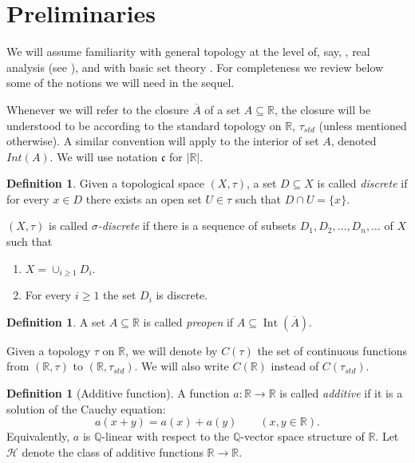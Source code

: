 \documentclass[11pt]{amsart} %
\theoremstyle{definition}
\newtheorem{definition}[theorem]{Definition}
\newcommand{\R}{\mathbb{R}}
\newcommand{\Q}{\mathbb{Q}}
\newcommand{\AD}{\mathcal{H}}
\begin{document}
\section{Preliminaries} 

We will assume familiarity with general topology at the level of, say, \cite{26}, real analysis (see \cite{5}), and with basic set theory \cite{7}. For completeness we review below some of the notions we will need in the sequel. 

Whenever we will refer to the closure $\overline{A}$ of a set $A\subseteq \R$, the closure will be understood to be according to the standard topology on $
\R$, $\tau_{std}$ (unless mentioned otherwise). A similar convention will apply to the interior of set $A$, denoted $Int(A)$. We will use notation $\mathfrak{c}$ for $|\R|$. 

\begin{definition} Given a topological space $(X,\tau)$, 
a set $D\subseteq X$ is called \emph{discrete} if for every $x\in D$ there exists an open set $U\in \tau$ such that 
$D\cap U = \{x\}$. 

$(X,\tau)$ is called \emph{$\sigma$-discrete} if there is a sequence of subsets $D_1,D_2, \ldots, D_n, \ldots $ of $X$ such that 
\begin{enumerate} 
\item $X=\cup_{i\geq 1} D_i$. 
\item For every $i\geq 1$ the set $D_i$ is discrete. 
\end{enumerate} 
\end{definition} 

\begin{definition}
A set $A\subseteq\mathbb R$ is called \emph{preopen} if $A\subseteq\operatorname{Int}(\overline{A})$.
\end{definition}

Given a topology $\tau$ on $\R$, we will denote by $C(\tau)$ the set of continuous functions from $(\R,\tau)$ to $(\R,\tau_{std})$. We will also write $C(\R)$ instead of $C(\tau_{std})$. 


\begin{definition}[Additive function]
A function $a:\R\to\R$ is called \emph{additive} if it is a solution of the Cauchy equation: 
\[
a(x+y)=a(x)+a(y)\qquad (x,y\in\R).
\]
Equivalently, $a$ is $\Q$-linear with respect to the $\Q$-vector space structure of $\R$. Let $\AD$ denote the class of additive functions $\R\to\R$. 
\end{definition}
\end{document}
